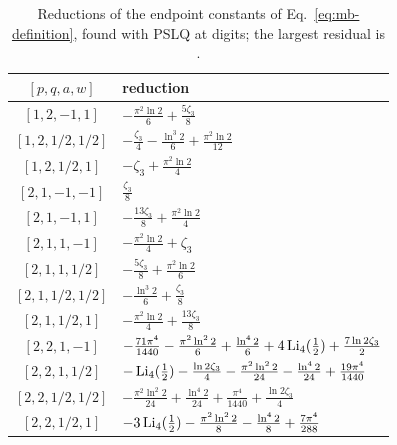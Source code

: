 \begin{table}[t]
\centering


\small
\begin{tabular}{cl}
\toprule
$[p,q,a,w]$ & reduction \\
\midrule
$[1,2,-1,1]$ & $- \frac{\pi^{2} \ln 2}{6} + \frac{5 \zeta_3}{8}$ \\
$[1,2,1/2,1/2]$ & $- \frac{\zeta_3}{4} - \frac{\ln^{3}2}{6} + \frac{\pi^{2} \ln 2}{12}$ \\
$[1,2,1/2,1]$ & $- \zeta_3 + \frac{\pi^{2} \ln 2}{4}$ \\
$[2,1,-1,-1]$ & $\frac{\zeta_3}{8}$ \\
$[2,1,-1,1]$ & $- \frac{13 \zeta_3}{8} + \frac{\pi^{2} \ln 2}{4}$ \\
$[2,1,1,-1]$ & $- \frac{\pi^{2} \ln 2}{4} + \zeta_3$ \\
$[2,1,1,1/2]$ & $- \frac{5 \zeta_3}{8} + \frac{\pi^{2} \ln 2}{6}$ \\
$[2,1,1/2,1/2]$ & $- \frac{\ln^{3}2}{6} + \frac{\zeta_3}{8}$ \\
$[2,1,1/2,1]$ & $- \frac{\pi^{2} \ln 2}{4} + \frac{13 \zeta_3}{8}$ \\
$[2,2,1,-1]$ & $- \frac{71 \pi^{4}}{1440} - \frac{\pi^{2} \ln^{2}2}{6} + \frac{\ln^{4}2}{6} + 4 \operatorname{Li}_4(\tfrac12) + \frac{7 \ln 2 \zeta_3}{2}$ \\
$[2,2,1,1/2]$ & $- \operatorname{Li}_4(\tfrac12) - \frac{\ln 2 \zeta_3}{4} - \frac{\pi^{2} \ln^{2}2}{24} - \frac{\ln^{4}2}{24} + \frac{19 \pi^{4}}{1440}$ \\
$[2,2,1/2,1/2]$ & $- \frac{\pi^{2} \ln^{2}2}{24} + \frac{\ln^{4}2}{24} + \frac{\pi^{4}}{1440} + \frac{\ln 2 \zeta_3}{4}$ \\
$[2,2,1/2,1]$ & $- 3 \operatorname{Li}_4(\tfrac12) - \frac{\pi^{2} \ln^{2}2}{8} - \frac{\ln^{4}2}{8} + \frac{7 \pi^{4}}{288}$ \\
\bottomrule
\end{tabular}
\caption{Reductions of the endpoint constants of Eq.~\eqref{eq:mb-definition}, found with PSLQ at \PSLQDigits{} digits; the largest residual is \PSLQResidual.}
\label{tab:mb-constants}
\end{table}
